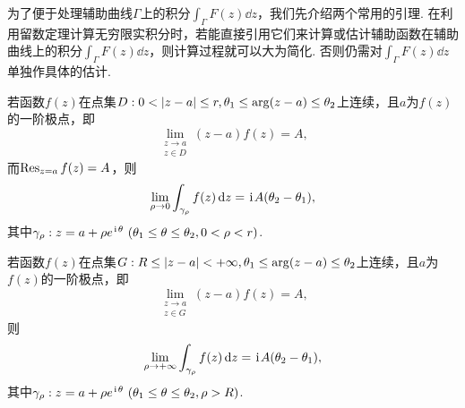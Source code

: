 为了便于处理辅助曲线\(\Gamma\)上的积分\(\int_\Gamma F(z) \dd{z}\)，我们先介绍两个常用的引理.
在利用留数定理计算无穷限实积分时，若能直接引用它们来计算或估计辅助函数在辅助曲线上的积分\(\int_\Gamma F(z) \dd{z}\)，则计算过程就可以大为简化.
否则仍需对\(\int_\Gamma F(z) \dd{z}\)单独作具体的估计.

\begin{lemma}\label{theorem:留数定理.计算积分路径上没有奇点的无穷限积分.引理1}
若函数\(f(z)\)在点集\(D: 0<\abs{z-a}\leq r, \theta_1 \leq \arg(z-a) \leq \theta_2\)上连续，且\(a\)为\(f(z)\)的一阶极点，即\begin{equation}
\lim\limits_{\substack{z \to a \\ z \in D}} (z-a) f(z) = A,
\end{equation}
而\(\operatorname{Res}_{z=a} f(z) = A\)，则\begin{equation}
\lim\limits_{\rho\to0} \int_{\gamma_{\rho}} f(z) \dd{z} = \kern1pt\mathrm{i}\kern1pt A (\theta_2-\theta_1),
\end{equation}
其中\(\gamma_{\rho}: z=a+\rho e^{\kern1pt\mathrm{i}\kern1pt\theta}\ (\theta_1 \leq \theta \leq \theta_2, 0 < \rho < r)\).

若函数\(f(z)\)在点集\(G: R \leq \abs{z-a} < +\infty, \theta_1 \leq \arg(z-a) \leq \theta_2\)上连续，且\(a\)为\(f(z)\)的一阶极点，即\begin{equation}
\lim\limits_{\substack{z \to a \\ z \in G}} (z-a) f(z) = A,
\end{equation}则\begin{equation}
\lim\limits_{\rho\to+\infty} \int_{\gamma_{\rho}} f(z) \dd{z} = \kern1pt\mathrm{i}\kern1pt A (\theta_2-\theta_1),
\end{equation}
其中\(\gamma_{\rho}: z=a+\rho e^{\kern1pt\mathrm{i}\kern1pt\theta}\ (\theta_1 \leq \theta \leq \theta_2, \rho > R)\).
\end{lemma}

